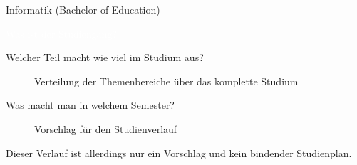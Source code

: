 	\begin{Huge}
			Informatik (Bachelor of Education)
		\end{Huge}
		\begin{exampleblock}{\textcolor{white}{Was ist der Studiengang?}}
			
		\end{exampleblock}
	
	\begin{block}{Welcher Teil macht wie viel im Studium aus?}
		\begin{figure}[h!]
			\caption{Verteilung der Themenbereiche über das komplette Studium}
		\end{figure}
	\end{block}
	
	\begin{block}{Was macht man in welchem Semester?}
		\begin{figure}[h!]
			\caption{Vorschlag für den Studienverlauf}
		\end{figure}
		Dieser Verlauf ist allerdings nur ein Vorschlag und kein bindender Studienplan.
	\end{block}
